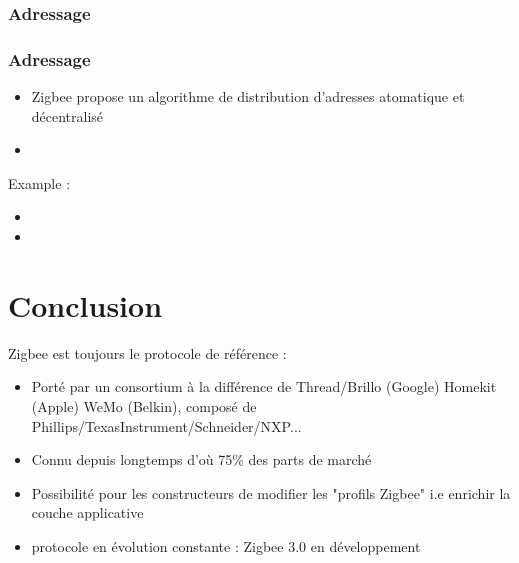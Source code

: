 \documentclass{beamer}
\begin{document}
  \begin{frame}
   \frametitle{Adressage}
  \end{frame}



  \begin{frame}
    \frametitle{Adressage}
    \begin{itemize}
      \item Zigbee propose un algorithme de distribution d'adresses atomatique et décentralisé
      \item 
    \end{itemize}
    Example : 
    \begin{itemize}
      \item 
      \item 
    \end{itemize}
  \end{frame}

\section{Conclusion}
  \begin{frame}
  	\begin{block}{Zigbee est toujours le protocole de référence :}
	\begin{itemize}
		\item Porté par un consortium à la différence de Thread/Brillo (Google) Homekit (Apple) WeMo (Belkin), composé de Phillips/TexasInstrument/Schneider/NXP...
		\item Connu depuis longtemps d'où 75\% des parts de marché
		\item Possibilité pour les constructeurs de modifier les "profils Zigbee" i.e enrichir la couche applicative
		\item protocole en évolution constante : Zigbee 3.0 en développement
\end{itemize}  
\end{block}
\end{frame}
  
\end{document}
